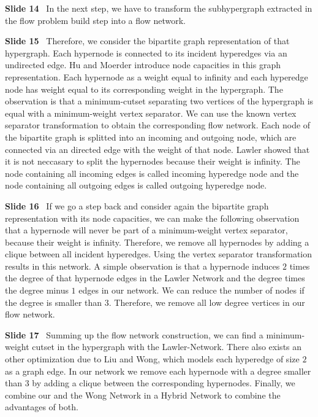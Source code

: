 \documentclass[11pt]{llncs}
\newcommand{\fakepar}[1]{\medskip\par\textbf{#1}\ }
\begin{document}
\fakepar{Slide 14} In the next step, we have to transform the subhypergraph extracted
in the flow problem build step into a flow network.

\fakepar{Slide 15} Therefore, we consider the bipartite graph representation of that
hypergraph. Each hypernode is connected to its incident hyperedges via an undirected
edge. Hu and Moerder introduce node capacities in this graph representation. Each hypernode
as a weight equal to infinity and each hyperedge node has weight equal to its corresponding
weight in the hypergraph. The observation is that a minimum-cutset separating two vertices
of the hypergraph is equal with a minimum-weight vertex separator. We can use the known
vertex separator transformation to obtain the corresponding flow network. Each node of the bipartite
graph is splitted into an incoming and outgoing node, which are connected via an directed edge with
the weight of that node. Lawler showed that it is not neccasary to split the hypernodes because
their weight is infinity. The node containing all incoming edges is called incoming hyperedge node
and the node containing all outgoing edges is called outgoing hyperedge node.

\fakepar{Slide 16} If we go a step back and consider again the bipartite graph representation
with its node capacities, we can make the following observation that a hypernode will never
be part of a minimum-weight vertex separator, because their weight is infinity. Therefore,
we remove all hypernodes by adding a clique between all incident hyperedges. Using the vertex
separator transformation results in this network. A simple observation is that a hypernode
induces $2$ times the degree of that hypernode edges in the Lawler Network and the degree times
the degree minus $1$ edges in our network. We can reduce the number of nodes if the 
degree is smaller than $3$. Therefore, we remove all low degree vertices in our flow network.

\fakepar{Slide 17} Summing up the flow network construction, we can find a minimum-weight cutset
in the hypergraph with the Lawler-Network. There also exists an other optimization due to Liu and
Wong, which models each hyperedge of size $2$ as a graph edge. In our network we remove each hypernode
with a degree smaller than $3$ by adding a clique between the corresponding hypernodes. Finally, we
combine our and the Wong Network in a Hybrid Network to combine the advantages of both.
\end{document}
